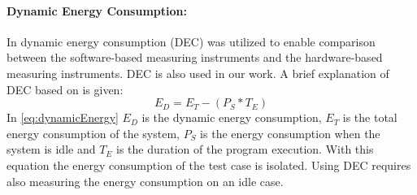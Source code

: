 \paragraph{Dynamic Energy Consumption:}
In \cite{fahad2019comparative,biksbois} dynamic energy consumption (DEC) was utilized to enable comparison between the software-based measuring instruments and the hardware-based measuring instruments. DEC is also used in our work. A brief explanation of DEC based on \cite{fahad2019comparative} is given:
\begin{equation}\label{eq:dynamicEnergy}
    E_D = E_T - (P_S * T_E)
\end{equation}
In \cref{eq:dynamicEnergy} $E_D$ is the dynamic energy consumption, $E_T$ is the total energy consumption of the system, $P_S$ is the energy consumption when the system is idle and $T_E$ is the duration of the program execution. With this equation the energy consumption of the test case is isolated. Using DEC requires also measuring the energy consumption on an idle case. \cite{fahad2019comparative}
